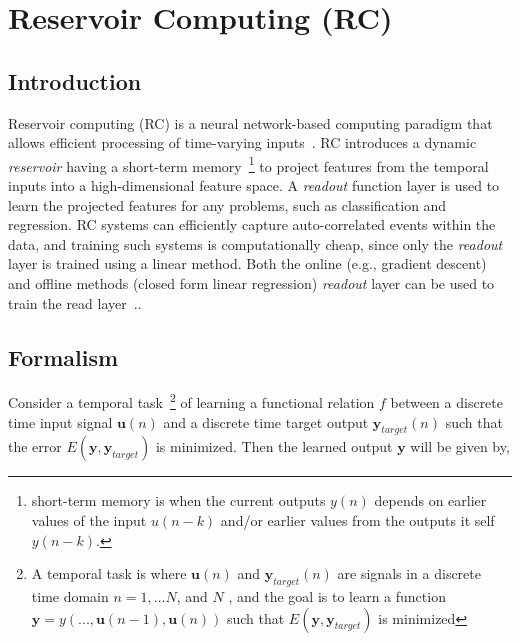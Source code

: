 \documentclass{WitsPhysicsReport}
\begin{document}
\newpage
\section{Reservoir Computing (RC)}
\label{sec:Reservoir_Computing}
\subsection{Introduction}
Reservoir computing (RC) is a neural network-based computing paradigm that allows efficient processing of time-varying inputs~\cite{du2017reservoir}. RC introduces a dynamic \textit{reservoir} having a short-term memory~\footnote{short-term memory is when the current outputs $y(n)$ depends on earlier values of the input $u(n-k)$ and/or earlier values from the outputs it self $y(n-k)$.} to project features from the temporal inputs into a high-dimensional feature space. A \textit{readout} function layer is used to learn the projected features for any problems, such as classification and regression. RC systems can efficiently capture auto-correlated events within the data, and training such systems is computationally cheap, since only the \textit{readout} layer is trained using a linear method. Both the online (e.g., gradient descent) and offline methods (closed form linear regression) \textit{readout} layer can be used to train the read layer~\cite{DBLP:journals/corr/GoudarziMBFTS16}..



\subsection{Formalism}
\label{sec:Formalism}


Consider a temporal task~\footnote{A temporal task is where $\mathbf{u}(n)$ and $\mathbf{y}_{target}(n)$ are signals in a discrete time domain $n = 1,...N$, and $N$ , and the goal is to learn a function $\mathbf{y} = y(...,\mathbf{u}(n-1),\mathbf{u}(n))$ such that  $E(\mathbf{y}, \mathbf{y}_{target})$ is minimized} of learning a functional relation $f$ between a discrete time input signal $\mathbf{u}(n)$ and a discrete time target output $\mathbf{y}_{target}(n)$ such that the error $E (\mathbf{y}, \mathbf{y}_{target})$ is minimized. Then the learned output $\mathbf{y}$ will be given by,
\end{document}
